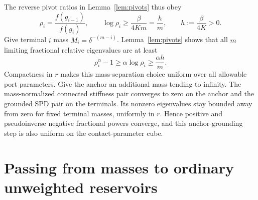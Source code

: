 \documentclass[11pt]{article}
\begin{document}
The reverse pivot ratios in Lemma~\ref{lem:pivots} thus obey
\[
 \rho_i=\frac{f(g_{i-1})}{f(g_i)},\qquad
 \log\rho_i\ge\frac{\beta}{4Km}=\frac hm,
 \qquad h:=\frac\beta{4K}>0.
\]
Give terminal $i$ mass $M_i=\delta^{-(m-i)}$.
Lemma~\ref{lem:pivots} shows that all $m$ limiting fractional relative
eigenvalues are at least
\[
 \rho_i^\alpha-1\ge\alpha\log\rho_i\ge\frac{\alpha h}{m}.
\]
Compactness in $r$ makes this mass-separation choice uniform over all
allowable port parameters. Give the anchor an additional mass tending
to infinity. The mass-normalized connected stiffness pair converges to
zero on the anchor and the grounded SPD pair on the terminals.
Its nonzero eigenvalues stay bounded away from zero for fixed terminal
masses, uniformly in $r$. Hence positive and pseudoinverse negative
fractional powers converge, and this anchor-grounding step is also
uniform on the contact-parameter cube.

\section*{Passing from masses to ordinary unweighted reservoirs}
\end{document}

